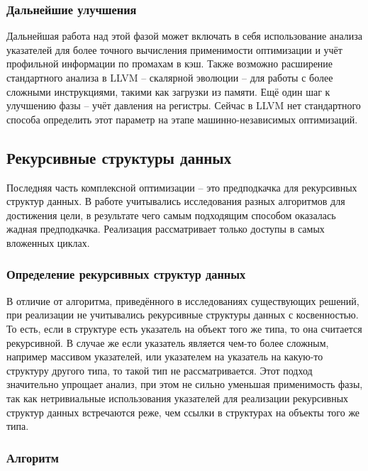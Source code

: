 \documentclass[12pt,a4paper]{article}
\begin{document}
\subsubsection{Дальнейшие улучшения}

\indent

Дальнейшая работа над этой фазой может включать в себя использование анализа указателей для более точного вычисления применимости оптимизации и учёт профильной информации по промахам в кэш. Также возможно расширение стандартного анализа в LLVM -- скалярной эволюции -- для работы с более сложными инструкциями, такими как загрузки из памяти. Ещё один шаг к улучшению фазы -- учёт давления на регистры. Сейчас в LLVM нет стандартного способа определить этот параметр на этапе машинно-независимых оптимизаций.

\subsection{Рекурсивные структуры данных}

\indent

Последняя часть комплексной оптимизации -- это предподкачка для рекурсивных структур данных. В работе учитывались исследования разных алгоритмов для достижения цели, в результате чего самым подходящим способом оказалась жадная предподкачка. Реализация рассматривает только доступы в самых вложенных циклах.

\subsubsection{Определение рекурсивных структур данных}

\indent

В отличие от алгоритма, приведённого в исследованиях существующих решений, при реализации не учитывались рекурсивные структуры данных с косвенностью. То есть, если в структуре есть указатель на объект того же типа, то она считается рекурсивной. В случае же если указатель является чем-то более сложным, например массивом указателей, или указателем на указатель на какую-то структуру другого типа, то такой тип не рассматривается. Этот подход значительно упрощает анализ, при этом не сильно уменьшая применимость фазы, так как нетривиальные использования указателей для реализации рекурсивных структур данных встречаются реже, чем ссылки в структурах на объекты того же типа.

\subsubsection{Алгоритм}
\end{document}
